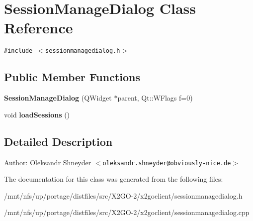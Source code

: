 \section{Session\-Manage\-Dialog Class Reference}
\label{classSessionManageDialog}
{\tt \#include $<$sessionmanagedialog.h$>$}

\subsection*{Public Member Functions}
\begin{CompactItemize}
\item 
\textbf{Session\-Manage\-Dialog} (QWidget $\ast$parent, Qt::WFlags f=0)\label{classSessionManageDialog_022e15f3d83c03c3f4611ae8294cfb04}

\item 
void \textbf{load\-Sessions} ()\label{classSessionManageDialog_0d632645bf27891af7b177483f831328}

\end{CompactItemize}


\subsection{Detailed Description}
\begin{Desc}
\item[Author:]Oleksandr Shneyder $<$\tt{oleksandr.shneyder@obviously-nice.de}$>$ \end{Desc}




The documentation for this class was generated from the following files:\begin{CompactItemize}
\item 
/mnt/nfs/up/portage/distfiles/src/X2GO-2/x2goclient/sessionmanagedialog.h\item 
/mnt/nfs/up/portage/distfiles/src/X2GO-2/x2goclient/sessionmanagedialog.cpp\end{CompactItemize}
